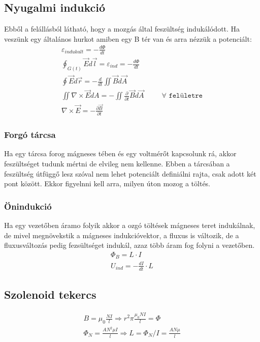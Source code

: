 \documentclass{article}
\begin{document}
\subsection{Nyugalmi indukció}
Ebből a felállásból látható, hogy a mozgás  által feszültség indukálódott. Ha veszünk egy általános hurkot amiben egy B tér van és arra nézzük a potenciált:
\begin{gather*}
\varepsilon_{indukalt} = -\frac{d\Phi}{dt} \\
\oint_{G(t)} \vec{E} d\vec{l} = \varepsilon_{ind} = -\frac{d\Phi}{dt} \\
\oint  \vec{E} d\vec{r} = -\frac{d}{dt} \iint \vec{B} d\vec{A} \\
\iint \nabla \times \vec{E} dA = - \iint \frac{\partial}{\partial t} \vec{B} d\vec{A} \hspace{30pt} \forall \texttt{ felületre} \\
\nabla \times \vec{E} = -\frac{\partial \vec{B}}{\partial t}
\end{gather*}
\subsubsection{Forgó tárcsa}
Ha egy tárcsa forog mágneses tében és egy voltmérőt kapcsolunk rá, akkor feszültséget tudunk mértni de elvileg nem kellenne. Ebben a tárcsában a feszültség útfüggő lesz szóval nem lehet potenciált definiálni rajta, csak adott két pont között. Ekkor figyelnni kell arra, milyen úton mozog a töltés.
\subsubsection{Önindukció}
Ha egy vezetőben áramo folyik akkor a ozgó töltések mágneses teret indukálnak, de mivel megnövekstik a mágneses indukcióvektor, a fluxus is változik, de a fluxusváltozás pedig fezsültséget indukál, azaz több áram fog folyni a vezetőben. 
\begin{gather*}
\Phi_B = L \cdot I \\
U_{ind} = -\frac{dI}{dt} \cdot L 
\end{gather*}
\subsection{Szolenoid tekercs}
\begin{gather*}
B=\mu_0 \frac{NI}{l} \Rightarrow r^2\pi \frac{\mu_0NI}{l} = \Phi \\
\Phi_N = \frac{AN^2\mu I}{l} \Rightarrow L=\Phi_N/I = \frac{AN\mu}{l}
\end{gather*}
\end{document}
